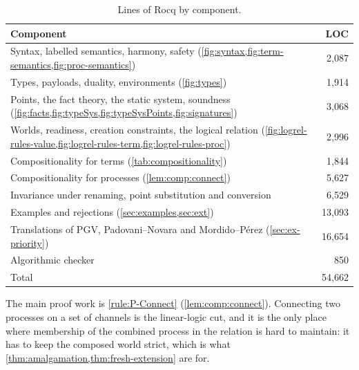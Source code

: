\begin{table}[t]
  \caption{Lines of Rocq by component.}
  \label{tab:mechanization}
  \begin{tabular}{lr}
    \toprule
    Component                                                                      & LOC          \\
    \midrule
    Syntax, labelled semantics, harmony, safety (\cref{fig:syntax,fig:term-semantics,fig:proc-semantics}) & 2,087        \\
    Types, payloads, duality, environments (\cref{fig:types})                      & 1,914        \\
    Points, the fact theory, the static system, soundness (\cref{fig:facts,fig:typeSys,fig:typeSysPoints,fig:signatures}) & 3,068        \\
    Worlds, readiness, creation constraints, the logical relation (\cref{fig:logrel-rules-value,fig:logrel-rules-term,fig:logrel-rules-proc}) & 2,996        \\
    Compositionality for terms (\cref{tab:compositionality})                       & 1,844        \\
    Compositionality for processes (\cref{lem:comp:connect})                       & 5,627        \\
    Invariance under renaming, point substitution and conversion                   & 6,529        \\
    Examples and rejections (\cref{sec:examples,sec:ext})                          & 13,093       \\
    Translations of PGV, Padovani--Novara and Mordido--P\'erez (\cref{sec:ex-priority}) & 16,654 \\
    Algorithmic checker                                                            & 850         \\
    \midrule
    Total                                                                          & 54,662       \\
    \bottomrule
  \end{tabular}
\end{table}

The main proof work is \ref{rule:P-Connect} (\cref{lem:comp:connect}).
Connecting two processes on a set of channels is the linear-logic cut,
and it is the only place where membership of the combined process in the
relation is hard to maintain: it has to keep the composed world strict,
which is what \cref{thm:amalgamation,thm:fresh-extension} are for.

